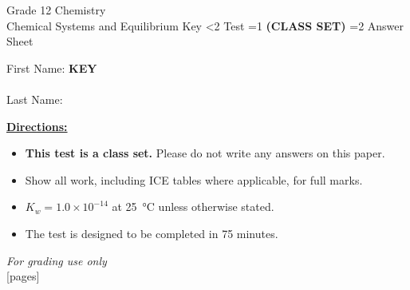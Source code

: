 \documentclass[addpoints]{exam}
\newcommand{\event}{Chemical Systems and Equilibrium}
\newcommand{\tournament}{}  %
\def\type{0}
\begin{document}
\begin{center}
    {\huge Grade 12 Chemistry \\ \event
    \ifprintanswers
     \space Key
    \else
     \space \ifnum\type<2 Test \fi \ifnum\type=1 \textbf{(CLASS SET)} \fi \ifnum\type=2 Answer Sheet \fi
    \fi \\ \vspace{3mm}\tournament\vspace{1mm}}
\end{center}

\vspace{.25\textheight}

\begin{center}
    First Name: \ifprintanswers
    \underline{\hspace{3.5cm}}\textbf{KEY}\underline{\hspace{5.5cm}}\\\vspace{5mm}
    \else
        \underline{\hspace{10cm}}\\ \vspace{5mm}
    \fi
    Last Name: \underline{\hspace{10cm}}\\ \vspace{5mm}
\end{center}

\noindent\textbf{\underline{Directions:}}
\begin{itemize}
    \ifnum\type=1 \item \textbf{This test is a class set.} Please do not write any answers on this paper. \fi
    \item Show all work, including ICE tables where applicable, for full marks.
    \item $K_w = 1.0 \times 10^{-14}$ at \SI{25}{\celsius} unless otherwise stated.
    \item The test is designed to be completed in 75 minutes.
\end{itemize}
\begin{center}
\textit{For grading use only}\\
[pages]
\end{center}
\end{document}

